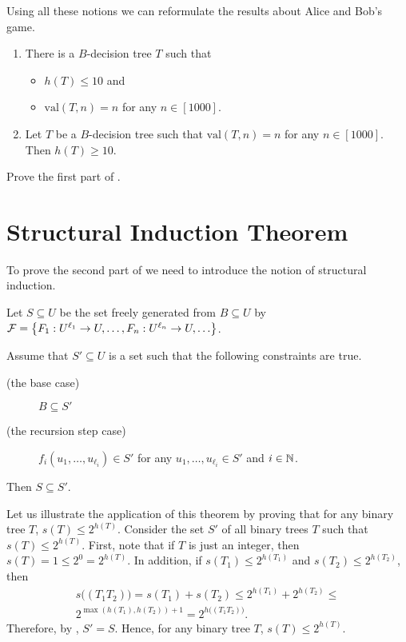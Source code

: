 Using all these notions we can reformulate the results about Alice and Bob's
game.
\begin{theorem}
\label{theorem:guess-the-number}
  \begin{enumerate}
    \item There is a $B$-decision tree $T$ such that
      \begin{itemize}
        \item $h(T) \le 10$ and
        \item $\mathrm{val}(T, n) = n$ for any $n \in [1000]$.
      \end{itemize}
    \item Let $T$ be a $B$-decision tree such that $\mathrm{val}(T, n) = n$ for
      any $n \in [1000]$. Then $h(T) \ge 10$.
  \end{enumerate}
\end{theorem}

\begin{exercise}
  Prove the first part of .
\end{exercise}

\section{Structural Induction Theorem}
To prove the second part of  we need
to introduce the notion of structural induction.

\begin{theorem}
\label{theorem:structural-induction}
    Let $S \subseteq U$ be the set freely generated from $B \subseteq U$ by
    $\mathcal{F} =
      \set{F_1 : U^{\ell_1} \to U, \dots, F_n : U^{\ell_n} \to U, \dots }$.

    Assume that $S' \subseteq U$ is a set such that the following constraints
    are true.
    \begin{description}
        \item [(the base case)] $B \subseteq S'$
        \item[(the recursion step case)]
          $f_i(u_1, \dots, u_{\ell_i}) \in S'$ for any
          $u_1, \dots, u_{\ell_i} \in S'$ and $i \in {\mathbb{N}}$.
    \end{description}
    Then $S \subseteq S'$.
\end{theorem}

Let us illustrate the application of this theorem by proving that for any
binary tree $T$, $s(T) \le 2^{h(T)}$.
Consider the set $S'$ of all binary trees $T$ such that $s(T) \le 2^{h(T)}$.
First, note that if $T$ is just an integer, then $s(T) = 1 \le 2^0 = 2^{h(T)}$.
In addition, if $s(T_1) \le 2^{h(T_1)}$ and $s(T_2) \le 2^{h(T_2)}$, then
\begin{multline*}
    s\big( (T_1 T_2) \big) = s(T_1) + s(T_2) \le 2^{h(T_1)} + 2^{h(T_2)} \le \\
    2^{\max(h(T_1), h(T_2)) + 1} = 2^{h\big( (T_1 T_2) \big)}.
\end{multline*}
Therefore, by , $S' = S$. Hence, for any
binary tree $T$, $s(T) \le 2^{h(T)}$.

